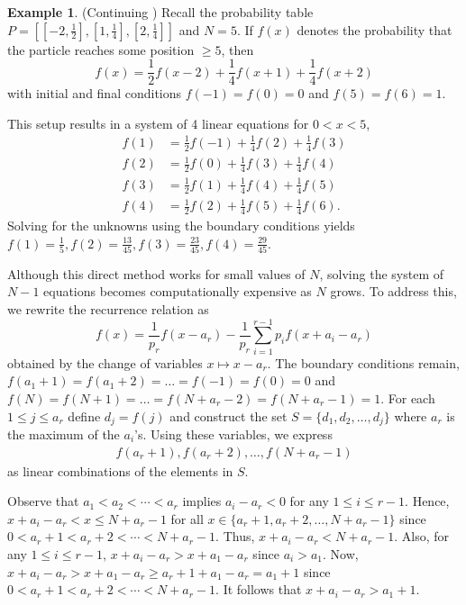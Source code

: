 \documentclass[reqno]{amsart}
\theoremstyle{definition}
\newtheorem{example}{Example}
\theoremstyle{definition}
\theoremstyle{remark}
\begin{document}
\begin{example}\label{ex:slow version N=5}(Continuing )
Recall the probability table $P=\left[[-2,\frac{1}{2}],[1,\frac{1}{4}],[2,\frac{1}{4}]\right]$ and $N=5$. If $f(x)$ denotes the probability that the particle reaches some position $\geq 5$, then
\begin{equation*}
    f(x)=\frac{1}{2}f(x-2)+\frac{1}{4}f(x+1)+\frac{1}{4}f(x+2)
\end{equation*}
with initial and final conditions $f(-1)=f(0)=0$ and $f(5)=f(6)=1$. 

\noindent This setup results in a system of 4 linear equations for $0<x<5$,
\begin{align*}
   f(1)&=\frac{1}{2}f(-1)+\frac{1}{4}f(2)+\frac{1}{4}f(3)\\
   f(2)&=\frac{1}{2}f(0)+\frac{1}{4}f(3)+\frac{1}{4}f(4)\\
   f(3)&=\frac{1}{2}f(1)+\frac{1}{4}f(4)+\frac{1}{4}f(5)\\
   f(4)&=\frac{1}{2}f(2)+\frac{1}{4}f(5)+\frac{1}{4}f(6).
\end{align*}
Solving for the unknowns using the boundary conditions yields $f(1)= \frac{1}{5}, f(2)=\frac{13}{45}, f(3)=\frac{23}{45}, f(4)=\frac{29}{45}$.
\end{example}

Although this direct method works for small values of $N$, solving the system of $N-1$ equations becomes computationally expensive as $N$ grows. To address this, we rewrite the recurrence relation  as
\begin{equation}\label{eq:bettergeneralprob}
f(x)=\frac{1}{p_r}f(x-a_r)-\frac{1}{p_r}\sum_{i=1}^{r-1}p_if(x+a_i-a_r)
\end{equation}
obtained by the change of variables $x\mapsto x-a_r$. The boundary conditions remain, $f(a_1+1)= f(a_1+2)= \ldots= f(-1)=f(0)=0$ and $f(N)=f(N+1)=\ldots = f(N+a_r-2)= f(N+a_r-1)=1$. For each $1\leq j \leq a_r$ define $d_j=f(j)$ and construct the set $S=\{d_1,d_2,\ldots, d_j\}$ where $a_r$ is the maximum of the $a_i$'s. Using these variables, we express 
\begin{align}\label{eq:linear equations for better recurrence}
    f(a_r+1),f(a_r+2),\ldots, f(N+a_r-1)
\end{align}
as linear combinations of the elements in $S$.

 
Observe that $a_1<a_2<\cdots<a_r$ implies $a_i-a_r<0$ for any $1\leq i \leq r-1$. Hence, $x+a_i-a_r<x\leq N+a_r-1$ for all $x\in \{a_r+1, a_r+2,\ldots, N+a_r-1\}$ since $0<a_r+1<a_r+2< \cdots< N+a_r-1$. Thus, $x+a_i-a_r< N+a_r-1$. Also, for any $1\leq i\leq r-1$, $x+a_i-a_r>x+a_1-a_r$ since $a_i> a_1$. Now, $x+a_i-a_r> x+a_1-a_r\geq a_r+1+a_1-a_r=a_1+1$ since $0<a_r+1<a_r+2<\cdots < N+a_r-1$. It follows that $x+a_i-a_r> a_1+1$.
\end{document}
